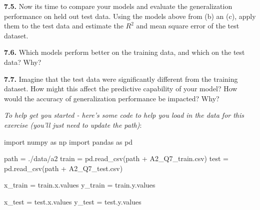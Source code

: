 \documentclass[
  letterpaper,
  DIV=11,
  numbers=noendperiod]{scrartcl}
\newenvironment{Shaded}{\begin{snugshade}}{\end{snugshade}}
\newcommand{\ImportTok}[1]{\textcolor[rgb]{0.00,0.46,0.62}{#1}}
\newcommand{\NormalTok}[1]{\textcolor[rgb]{0.00,0.23,0.31}{#1}}
\newcommand{\OperatorTok}[1]{\textcolor[rgb]{0.37,0.37,0.37}{#1}}
\newcommand{\StringTok}[1]{\textcolor[rgb]{0.13,0.47,0.30}{#1}}
\begin{document}
\textbf{7.5.} Now its time to compare your models and evaluate the
generalization performance on held out test data. Using the models above
from (b) an (c), apply them to the test data and estimate the \(R^2\)
and mean square error of the test dataset.

\textbf{7.6.} Which models perform better on the training data, and
which on the test data? Why?

\textbf{7.7.} Imagine that the test data were significantly different
from the training dataset. How might this affect the predictive
capability of your model? How would the accuracy of generalization
performance be impacted? Why?

\emph{To help get you started - here's some code to help you load in the
data for this exercise (you'll just need to update the path)}:

\begin{Shaded}
\begin{Highlighting}[]
\ImportTok{import}\NormalTok{ numpy }\ImportTok{as}\NormalTok{ np}
\ImportTok{import}\NormalTok{ pandas }\ImportTok{as}\NormalTok{ pd}

\NormalTok{path }\OperatorTok{=} \StringTok{\textquotesingle{}./data/a2\textquotesingle{}}
\NormalTok{train }\OperatorTok{=}\NormalTok{ pd.read\_csv(path }\OperatorTok{+} \StringTok{\textquotesingle{}A2\_Q7\_train.csv\textquotesingle{}}\NormalTok{)}
\NormalTok{test }\OperatorTok{=}\NormalTok{ pd.read\_csv(path }\OperatorTok{+} \StringTok{\textquotesingle{}A2\_Q7\_test.csv\textquotesingle{}}\NormalTok{)}

\NormalTok{x\_train }\OperatorTok{=}\NormalTok{ train.x.values}
\NormalTok{y\_train }\OperatorTok{=}\NormalTok{ train.y.values}

\NormalTok{x\_test }\OperatorTok{=}\NormalTok{ test.x.values}
\NormalTok{y\_test }\OperatorTok{=}\NormalTok{ test.y.values}
\end{Highlighting}
\end{Shaded}
\end{document}

